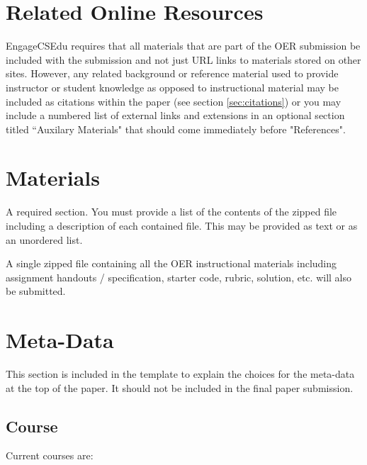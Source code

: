 \documentclass[acmengage]{acmart}
\begin{document}
\section{Related Online Resources}

EngageCSEdu requires that all materials that are part of the OER submission be included with the submission and not just URL links to materials stored on other sites. However, any related background or reference material used to provide instructor or student knowledge as opposed to instructional material may be included as citations within the paper
(see section \ref{sec:citations})
or you may include a numbered list of external links and extensions in an optional section titled ``Auxilary Materials" that should come immediately before "References".

\section{Materials}

A required section. You must provide a list of the contents of the zipped file including a description of each contained file. This may be provided as text or as an unordered list.

A single zipped file containing all the OER instructional materials including assignment handouts / specification, starter code, rubric, solution, etc. will also be submitted.

\section{Meta-Data}

This section is included in the template to explain the choices for the meta-data at the top of the paper. It should not be included in the final paper submission.

\subsection{Course}

Current courses are:
\end{document}
